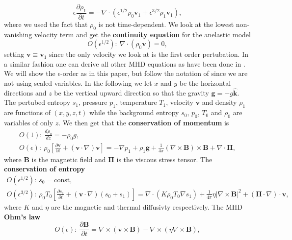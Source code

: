 \begin{equation}
    \epsilon\frac{\partial\rho_1}{\partial t} = -\nabla\cdot (\epsilon^{1/2}\rho_0\mathbf{v}_1+\epsilon^{3/2}\rho_1\mathbf{v}_1),
\end{equation}
where we used the fact that $\rho_0$ is not time-dependent. We look at the lowest non-vanishing velocity term and get the \textbf{continuity equation} for the anelastic model
\begin{equation}\label{eq:continuity}
    O(\epsilon^{1/2}):\ \nabla\cdot(\rho_0\mathbf{v})=0,
\end{equation}
setting $\mathbf{v}\equiv\mathbf{v}_1$ since the only velocity we look at is the first order pertubation. In a similar fashion one can derive all other MHD equations as have been done in \citep{1999ApJS..121..247L}. We will show the $\epsilon$-order as in this paper, but follow the notation of \citep{2021LRSP...18....5F} since we are not using scaled variables. In the following we let $x$ and $y$ be the horizontal directions and $z$ be the vertical upward direction so that the gravity $\mathbf{g}=-g\mathbf{\hat{k}}$. The pertubed entropy $s_1$, pressure $p_1$, temperature $T_1$, velocity $\mathbf{v}$ and density $\rho_1$ are functions of $(x,y,z,t)$ while the background entropy $s_0$, $p_0$, $T_0$ and $\rho_0$ are variables of only $z$. We then get that the \textbf{conservation of momentum} is
\begin{align}\label{eq:momentum}
    O(1):\ \frac{d\rho_0}{dz}=-\rho_0 g,\\
    O(\epsilon):\ \rho_0\left[\frac{\partial\mathbf{v}}{\partial t}+(\mathbf{v}\cdot\nabla)\mathbf{v}\right]=-\nabla p_1 + \rho_1\mathbf{g}+\frac{1}{4\pi}(\nabla\times\mathbf{B})\times\mathbf{B}+\nabla\cdot\mathbf{\Pi},
\end{align}
where $\mathbf{B}$ is the magnetic field and $\mathbf{\Pi}$ is the viscous stress tensor. The \textbf{conservation of entropy}
\begin{align}\label{eq:entropy_full}
    O(\epsilon^{1/2}):\ s_0=\text{const},\\
    O(\epsilon^{3/2}):\ \rho_0 T_0 \left[\frac{\partial s_1}{\partial t} + (\mathbf{v}\cdot \nabla)(s_0+s_1) \right]
    = \nabla\cdot(K\rho_0T_0\nabla s_1) + \frac{1}{4\pi}\eta \left| \nabla\times\mathbf{B} \right|^2+\left(\mathbf{\Pi}\cdot\nabla \right)\cdot\mathbf{v},
\end{align}
where $K$ and $\eta$ are the magnetic and thermal diffusivty respectively. The MHD \textbf{Ohm's law}
\begin{equation}\label{eq:ohms_law}
    O(\epsilon):\ \frac{\partial\mathbf{B}}{\partial t} = \nabla\times(\mathbf{v}\times\mathbf{B})-\nabla\times(\eta\nabla\times\mathbf{B}),
\end{equation}
